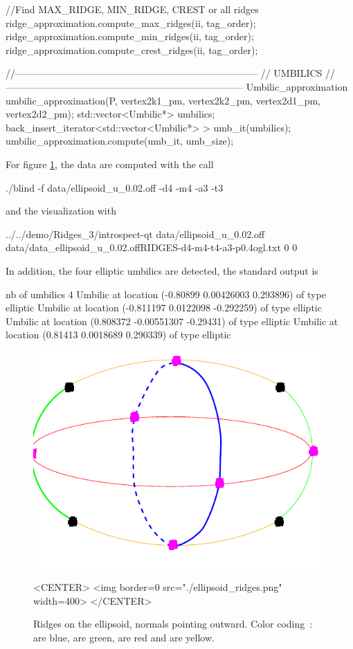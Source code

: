 \begin{ccExampleCode}
{  //Find MAX_RIDGE, MIN_RIDGE, CREST or all ridges
  ridge_approximation.compute_max_ridges(ii, tag_order);  
  ridge_approximation.compute_min_ridges(ii, tag_order);  
  ridge_approximation.compute_crest_ridges(ii, tag_order);  

  //---------------------------------------------------------------------------
  // UMBILICS
  //--------------------------------------------------------------------------
  Umbilic_approximation umbilic_approximation(P, 
					      vertex2k1_pm, vertex2k2_pm,
					      vertex2d1_pm, vertex2d2_pm);
  std::vector<Umbilic*> umbilics;
  back_insert_iterator<std::vector<Umbilic*> > umb_it(umbilics);
  umbilic_approximation.compute(umb_it, umb_size);
 }
\end{ccExampleCode}

For figure \ref{ellipsoid-ridges-example}, the data are computed with
the call
\begin{ccExampleCode}
./blind -f data/ellipsoid_u_0.02.off -d4 -m4 -a3 -t3
\end{ccExampleCode}
and the visualization with 
\begin{ccExampleCode}
 ../../demo/Ridges_3/introspect-qt data/ellipsoid_u_0.02.off data/data_ellipsoid_u_0.02.offRIDGES-d4-m4-t4-a3-p0.4ogl.txt 0 0
\end{ccExampleCode}
In addition, the four elliptic umbilics are detected, the standard output is 
\begin{ccExampleCode}
nb of umbilics 4
Umbilic at location (-0.80899 0.00426003 0.293896) of type elliptic
Umbilic at location (-0.811197 0.0122098 -0.292259) of type elliptic
Umbilic at location (0.808372 -0.00551307 -0.29431) of type elliptic
Umbilic at location (0.81413 0.0018689 0.290339) of type elliptic
\end{ccExampleCode}


\begin{figure}[!ht]
\begin{ccTexOnly}
\centerline{
\includegraphics[width=.5\linewidth]{Ridges_3/ellipsoid_ridges}}
\end{ccTexOnly}
\caption{Ridges on the ellipsoid, normals pointing outward.
 Color coding~:  are blue,
 are green,  are red and 
 are yellow. }
\label{ellipsoid-ridges-example}
\begin{ccHtmlOnly}
<CENTER> <img border=0 src="./ellipsoid_ridges.png" width=400>
</CENTER>
\end{ccHtmlOnly}
\end{figure}


